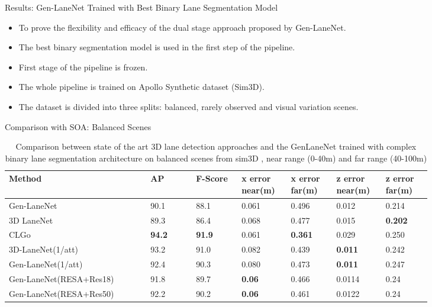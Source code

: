 \documentclass[aspectratio=169]{beamer}
\begin{document}
\begin{frame}{Results: Gen-LaneNet Trained with Best Binary Lane Segmentation Model }
\begin{itemize}
    \item To prove the flexibility and efficacy of the dual stage approach proposed by Gen-LaneNet.
    \item The best binary segmentation model is used in the first step of the pipeline. 
    \item First stage of the pipeline is frozen.
    \item The whole pipeline is trained on Apollo Synthetic dataset (Sim3D).
    \item The dataset is divided into three splits: balanced, rarely observed and visual variation scenes.
\end{itemize}
\end{frame}


\begin{frame}{Comparison with SOA: Balanced Scenes}
\begin{table}[h]
    \small
    \addtolength{\tabcolsep}{-1pt}
    \begin{center}
    \caption{Comparison between state of the art 3D lane detection approaches and the GenLaneNet trained with complex binary lane segmentation architecture on balanced scenes from sim3D , near range (0-40m) and far range (40-100m)}
    \begin{tabular}{|p{0.29\linewidth}|p{0.09\linewidth}|p{0.09\linewidth}|p{0.09\linewidth}|p{0.09\linewidth}|p{0.09\linewidth}|p{0.09\linewidth}|}
    \hline
        \textbf{Method} & \textbf{AP} & \textbf{F-Score} & \textbf{x error near(m)} & \textbf{x error far(m)} & \textbf{z error near(m)} & \textbf{z error far(m)} \\ \hline
        Gen-LaneNet & 90.1 & 88.1 & 0.061 & 0.496 & 0.012 & 0.214 \\ \hline
        3D LaneNet & 89.3 & 86.4 & 0.068 & 0.477 & 0.015 & \textbf{0.202} \\ \hline
        CLGo & \textbf{94.2} &\textbf{ 91.9} & 0.061 & \textbf{0.361} & 0.029 & 0.250 \\ \hline
        3D-LaneNet(1/att)  &  93.2 & 91.0 & 0.082 & 0.439 & \textbf{0.011} & 0.242 \\ \hline
        Gen-LaneNet(1/att)& 92.4 & 90.3 & 0.080 & 0.473 & \textbf{0.011} & 0.247 \\ \hline
        Gen-LaneNet(RESA+Res18) & 91.8 & 89.7 & \textbf{0.06} & 0.466 & 0.0114 & 0.24 \\ \hline
        Gen-LaneNet(RESA+Res50) & 92.2 & 90.2 &\textbf{ 0.06} & 0.461 & 0.0122 & 0.24 \\ \hline
    \end{tabular}
    \end{center}
    \end{table}

\end{frame}
\end{document}
